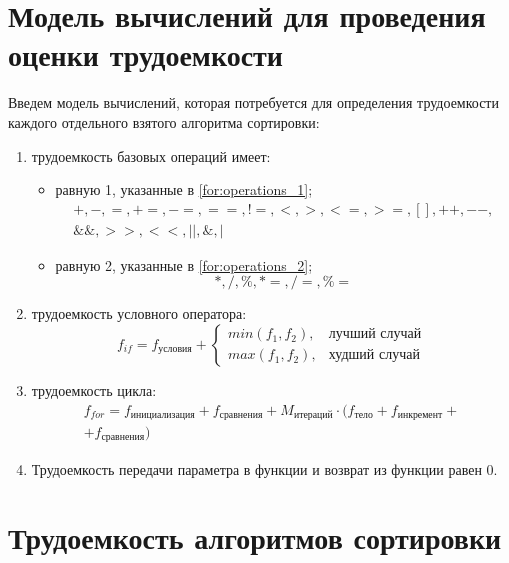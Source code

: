\section{Модель вычислений для проведения оценки трудоемкости}

Введем модель вычислений, которая потребуется для определения трудоемкости каждого отдельного взятого алгоритма сортировки:
\begin{enumerate}
	\item трудоемкость базовых операций имеет:
	\begin{itemize}
		\item равную 1, указанные в \ref{for:operations_1};
		\begin{equation}
			\label{for:operations_1}
			\begin{aligned}
				+, -, =, +=, -=, ==, !=, <, >, <=, >=, [], ++, {-}-,\\
				\&\&, >>, <<, ||, \&, |
			\end{aligned}
		\end{equation}
		\item равную 2, указанные в \ref{for:operations_2};
		\begin{equation}
			\label{for:operations_2}
			*, /, \%, *=, /=, \%=
		\end{equation}
	\end{itemize}
	\item трудоемкость условного оператора:
	\begin{equation}
		\label{for:if}
		f_{if} = f_{\text{условия}} + 
		\begin{cases}
			min(f_1, f_2), & \text{лучший случай}\\
			max(f_1, f_2), & \text{худший случай}
		\end{cases}
	\end{equation}
	\item трудоемкость цикла:
	\begin{equation}
		\label{for:for}
		\begin{aligned}
			f_{for} = f_{\text{инициализация}} + f_{\text{сравнения}} + M_{\text{итераций}} \cdot (f_{\text{тело}} + f_{\text{инкремент}} +\\
			+ f_{\text{сравнения}})
		\end{aligned}
	\end{equation}
	\item Трудоемкость передачи параметра в функции и возврат из функции равен 0.
\end{enumerate}

\section{Трудоемкость алгоритмов сортировки}

